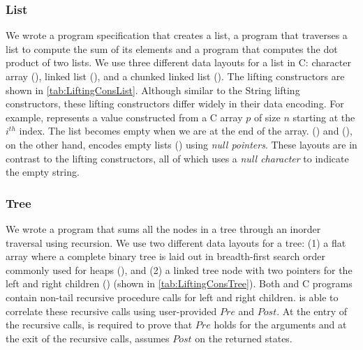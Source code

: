 \subsubsection{List}
\vspace{-5px}
We wrote a \SpecL{} program specification that creates a list, a
program that traverses a list to compute the sum of its elements and a program
that computes the dot product of two lists. We use three different
data layouts for a list in C: character array (),
linked list (), and
a chunked linked list ().
The lifting constructors are shown in \cref{tab:LiftingConsList}.
Although similar to the String lifting constructors, these lifting
constructors differ widely in their data encoding. For example,
 represents a  value constructed
from a C array $p$ of size $n$ starting at the $i^{th}$ index. The list becomes empty
when we are at the end of the array. ()
and (), on the other hand, encodes empty
lists () using {\em null pointers}. These layouts are in contrast to the
 lifting constructors, all of which uses a {\em null character} to
indicate the empty string.


\vspace{-15px}
\subsubsection{Tree}
\vspace{-5px}
We wrote a \SpecL{} program that sums all the nodes in a tree
through an inorder traversal using recursion. We use two different data layouts for a tree: 
(1) a flat array where a
complete binary tree is laid out in breadth-first search order commonly used for heaps (),
and (2) a linked tree node with two pointers for the left and right children () (shown in \cref{tab:LiftingConsTree}).
Both \SpecL{} and C programs contain non-tail recursive procedure calls for left and right children.
\toolName{} is able to correlate these recursive calls using user-provided $Pre$ and $Post$.
At the entry of the recursive calls, \toolName{} is required to prove that $Pre$ holds for the arguments
and at the exit of the recursive calls, \toolName{} assumes $Post$ on the returned states.


\vspace{-10px}
